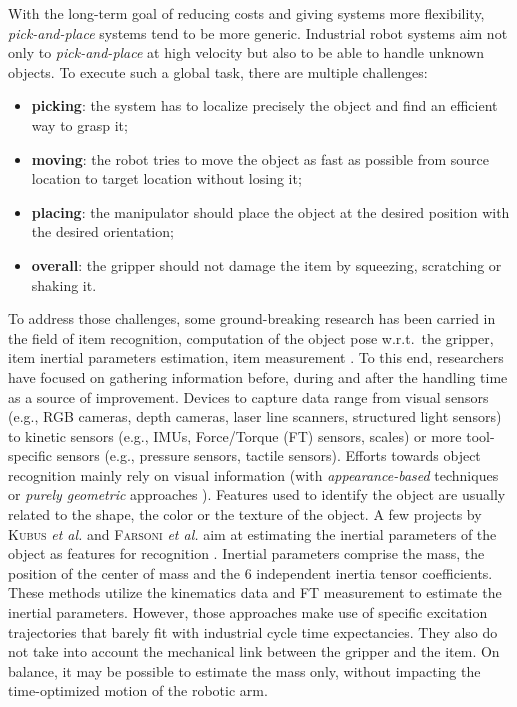 \documentclass[/home/francois/latex/report/main.tex]{subfiles}
\begin{document}
With the long-term goal of reducing costs and giving systems more flexibility, \textit{pick-and-place} systems tend to be more generic. Industrial robot systems aim not only to \textit{pick-and-place} at high velocity but also to be able to handle unknown objects. To execute such a global task, there are multiple challenges:
\begin{itemize}
    \item \textbf{picking}: the system has to localize precisely the object and find an efficient way to grasp it;
    \item \textbf{moving}: the robot tries to move the object as fast as possible from source location to target location without losing it;
    \item \textbf{placing}: the manipulator should place the object at the desired position with the desired orientation;
    \item \textbf{overall}: the gripper should not damage the item by squeezing, scratching or shaking it.
\end{itemize}

To address those challenges, some ground-breaking research has been carried in the field of item recognition, computation of the object pose w.r.t.\ the gripper, item inertial parameters estimation, item measurement \cite{Kubus2007, Kubus2008, Kubus2014}. To this end, researchers have focused on gathering information before, during and after the handling time as a source of improvement. Devices to capture data range from visual sensors (e.g., RGB cameras, depth cameras, laser line scanners, structured light sensors) to kinetic sensors (e.g., \ac{IMUs}, Force/Torque (FT) sensors, scales) or more tool-specific sensors (e.g., pressure sensors, tactile sensors). Efforts towards object recognition mainly rely on visual information (with \textit{appearance-based} techniques \cite{Carmichael2002, Schmid1997, Viola2001, Murase1993} or \textit{purely geometric} approaches \cite{Hut1987, Sethi2001}). Features used to identify the object are usually related to the shape, the color or the texture of the object. A few projects by \textsc{Kubus} \textit{et al.} and \textsc{Farsoni} \textit{et al.} aim at estimating the inertial parameters of the object as features for recognition \cite{Kubus2008, Kubus2007, Kubus2014, Farsoni2018}. Inertial parameters comprise the mass, the position of the center of mass and the 6 independent inertia tensor coefficients. These methods utilize the kinematics data and \ac{FT} measurement to estimate the inertial parameters. However, those approaches make use of specific excitation trajectories that barely fit with industrial cycle time expectancies. They also do not take into account the mechanical link between the gripper and the item. On balance, it may be possible to estimate the mass only, without impacting the time-optimized motion of the robotic arm.
\end{document}
